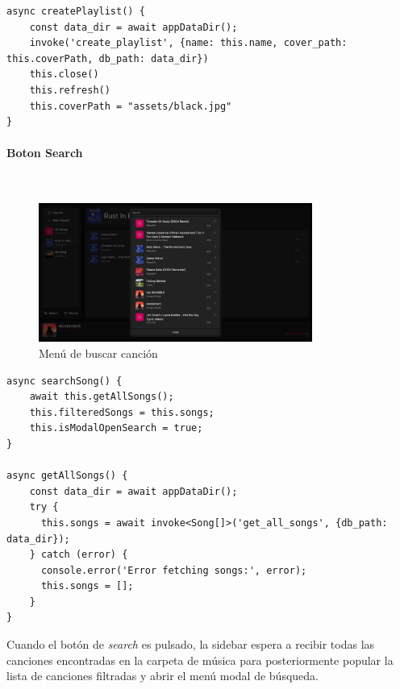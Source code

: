 \documentclass[11pt, a4paper]{article}
\begin{document}
                \begin{lstlisting}[caption={createPlaylist()}]
async createPlaylist() {
    const data_dir = await appDataDir();
    invoke('create_playlist', {name: this.name, cover_path: this.coverPath, db_path: data_dir})
    this.close()
    this.refresh()
    this.coverPath = "assets/black.jpg"
}
                \end{lstlisting}

                \paragraph{Boton Search}

                ‎ \\

                \begin{figure}[H]
                    \centering
                    \includegraphics[width=0.8\textwidth]{media/screenshots/search_song.png}
                    \caption{Menú de buscar canción}
                    \label{fig:buscar}
                \end{figure}

                \begin{lstlisting}[caption={searchSong()}]
async searchSong() {
    await this.getAllSongs();
    this.filteredSongs = this.songs;
    this.isModalOpenSearch = true;
}

async getAllSongs() {
    const data_dir = await appDataDir();
    try {
      this.songs = await invoke<Song[]>('get_all_songs', {db_path: data_dir});
    } catch (error) {
      console.error('Error fetching songs:', error);
      this.songs = [];
    }
}
                \end{lstlisting}

                Cuando el botón de \textit{search} es pulsado, la sidebar espera a recibir todas las canciones encontradas en la carpeta de música para posteriormente popular la lista de canciones filtradas y abrir el menú modal de búsqueda. \\
\end{document}
